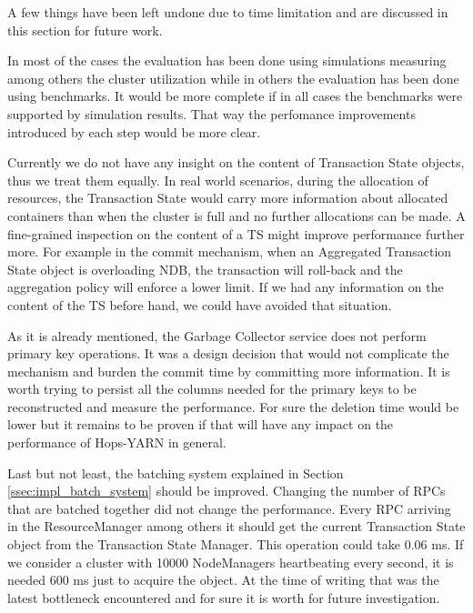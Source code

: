 A few things have been left undone due to time limitation and are
discussed in this section for future work.

In most of the cases the evaluation has been done using simulations
measuring among others the cluster utilization while in others the
evaluation has been done using benchmarks. It would be more complete
if in all cases the benchmarks were supported by simulation
results. That way the perfomance improvements introduced by each step
would be more clear.

Currently we do not have any insight on the content of Transaction
State objects, thus we treat them equally. In real world scenarios,
during the allocation of resources, the Transaction State would carry
more information about allocated containers than when the cluster is
full and no further allocations can be made. A fine-grained inspection
on the content of a TS might improve performance further more. For
example in the commit mechanism, when an Aggregated Transaction State
object is overloading NDB, the transaction will roll-back and the
aggregation policy will enforce a lower limit. If we had any
information on the content of the TS before hand, we could have
avoided that situation.

As it is already mentioned, the Garbage Collector service does not
perform primary key operations. It was a design decision that would
not complicate the mechanism and burden the commit time by committing
more information. It is worth trying to persist all the columns needed
for the primary keys to be reconstructed and measure the
performance. For sure the deletion time would be lower but it
remains to be proven if that will have any impact on the performance
of Hops-YARN in general.

Last but not least, the batching system explained in Section
\ref{ssec:impl_batch_system} should be improved. Changing the number
of RPCs that are batched together did not change the
performance. Every RPC arriving in the ResourceManager among others it
should get the current Transaction State object from the Transaction State
Manager. This operation could take $0.06$ ms. If we consider a cluster
with 10000 NodeManagers heartbeating every second, it is needed 600 ms
just to acquire the object. At the time of writing that was the latest
bottleneck encountered and for sure it is worth for future investigation.